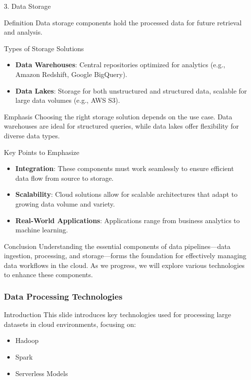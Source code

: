 \documentclass[aspectratio=169]{beamer}
\begin{document}
\begin{frame}[fragile]{3. Data Storage}
  \begin{block}{Definition}
    Data storage components hold the processed data for future retrieval and analysis.
  \end{block}

  \begin{block}{Types of Storage Solutions}
    \begin{itemize}
      \item \textbf{Data Warehouses}: Central repositories optimized for analytics (e.g., Amazon Redshift, Google BigQuery).
      \item \textbf{Data Lakes}: Storage for both unstructured and structured data, scalable for large data volumes (e.g., AWS S3).
    \end{itemize}
  \end{block}

  \begin{block}{Emphasis}
    Choosing the right storage solution depends on the use case. Data warehouses are ideal for structured queries, while data lakes offer flexibility for diverse data types.
  \end{block}
\end{frame}

\begin{frame}[fragile]{Key Points to Emphasize}
  \begin{itemize}
    \item \textbf{Integration}: These components must work seamlessly to ensure efficient data flow from source to storage.
    \item \textbf{Scalability}: Cloud solutions allow for scalable architectures that adapt to growing data volume and variety.
    \item \textbf{Real-World Applications}: Applications range from business analytics to machine learning.
  \end{itemize}
\end{frame}

\begin{frame}[fragile]{Conclusion}
  Understanding the essential components of data pipelines—data ingestion, processing, and storage—forms the foundation for effectively managing data workflows in the cloud. As we progress, we will explore various technologies to enhance these components.
\end{frame}

\begin{frame}[fragile]
    \frametitle{Data Processing Technologies}
    \begin{block}{Introduction}
        This slide introduces key technologies used for processing large datasets in cloud environments, focusing on:
        \begin{itemize}
            \item Hadoop
            \item Spark
            \item Serverless Models
        \end{itemize}
    \end{block}
\end{frame}
\end{document}

